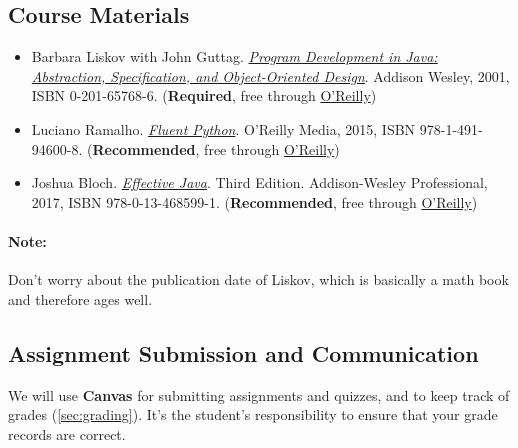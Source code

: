 \documentclass[11pt]{article}
\begin{document}
\subsection{Course Materials}
\begin{itemize}
  \item Barbara Liskov with John Guttag. \href{https://www.amazon.com/Program-Development-Java-Specification-Object-Oriented/dp/0201657686/ref=sr_1_2?dchild=1&qid=1626231221&refinements=p_27\%3ABarbara+Liskov&s=books&sr=1-2&text=Barbara+Liskov}{\emph{Program
  Development in Java: Abstraction, Specification, and Object-Oriented  Design}}. Addison Wesley, 2001, ISBN 0-201-65768-6.  (\textbf{Required}, free through \href{https://learning.oreilly.com/library/view/program-development-in/9780768685299/}{ O'Reilly})


\item Luciano Ramalho. \href{https://www.amazon.com/Fluent-Python-Concise-Effective-Programming-dp-1492056359/dp/1492056359/ref=dp_ob_title_bk}{\emph{Fluent Python}}. O'Reilly Media, 2015, ISBN 978-1-491-94600-8. (\textbf{Recommended}, free through \href{https://learning.oreilly.com/library/view/fluent-python/9781492056348/}{O'Reilly})

\item Joshua Bloch.
\href{https://www.amazon.com/Effective-Java-Joshua-Bloch/dp/0134685997/ref=sr_1_1?dchild=1&keywords=effective+java&qid=1626231154&sr=8-1}{\emph{Effective
  Java}}. Third Edition. Addison-Wesley Professional, 2017, ISBN
  978-0-13-468599-1. (\textbf{Recommended}, free through
        \href{https://learning.oreilly.com/library/view/effective-java-3rd/9780134686097/}{O'Reilly})

\end{itemize}

\paragraph{Note:} Don't worry about the publication date of Liskov, which is basically a math book and therefore ages well.

\subsection{Assignment Submission and Communication}
We will use \textbf{Canvas} for submitting assignments and quizzes, and to keep track of grades (\autoref{sec:grading}). 
It's the student's responsibility to
ensure that your grade records are correct.
\end{document}
